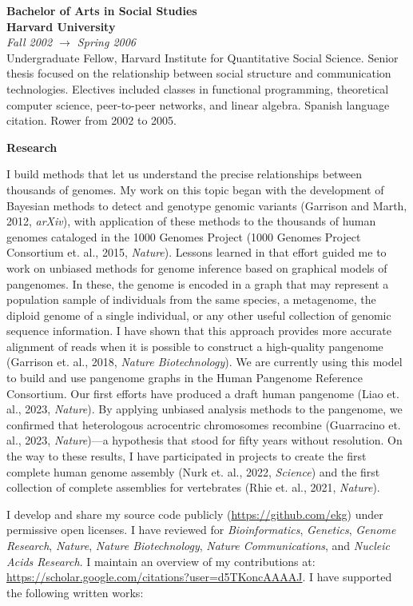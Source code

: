 \documentclass[11pt,hidelinks,letterpaper]{article}
\begin{document}
\hfill \break
\noindent
{\large \bf Bachelor of Arts in Social Studies \\ Harvard University} \\
\emph{Fall 2002 $\to$ Spring 2006} \\
\noindent
Undergraduate Fellow, Harvard Institute for Quantitative Social Science. Senior thesis focused on the relationship between social structure and communication technologies. Electives included classes in functional programming, theoretical computer science, peer-to-peer networks, and linear algebra. Spanish language citation. Rower from 2002 to 2005.

\hfill \break
\hfill \break
\noindent
{\LARGE \bf Research}

\hfill \break
\noindent
I build methods that let us understand the precise relationships between thousands of genomes.
My work on this topic began with the development of Bayesian methods to detect and genotype genomic variants (Garrison and Marth, 2012, \textit{arXiv}), with application of these methods to the thousands of human genomes cataloged in the 1000 Genomes Project (1000 Genomes Project Consortium et. al., 2015, \textit{Nature}).
Lessons learned in that effort guided me to work on unbiased methods for genome inference based on graphical models of pangenomes.
In these, the genome is encoded in a graph that may represent a population sample of individuals from the same species, a metagenome, the diploid genome of a single individual, or any other useful collection of genomic sequence information.
I have shown that this approach provides more accurate alignment of reads when it is possible to construct a high-quality pangenome (Garrison et. al., 2018, \textit{Nature Biotechnology}).
We are currently using this model to build and use pangenome graphs in the Human Pangenome Reference Consortium.
Our first efforts have produced a draft human pangenome (Liao et. al., 2023, \textit{Nature}).
By applying unbiased analysis methods to the pangenome, we confirmed that heterologous acrocentric chromosomes recombine (Guarracino et. al., 2023, \textit{Nature})---a hypothesis that stood for fifty years without resolution.
On the way to these results, I have participated in projects to create the first complete human genome assembly (Nurk et. al., 2022, \textit{Science}) and the first collection of complete assemblies for vertebrates (Rhie et. al., 2021, \textit{Nature}).

I develop and share my source code publicly (\url{https://github.com/ekg}) under permissive open licenses.
I have reviewed for \emph{Bioinformatics}, \emph{Genetics}, \emph{Genome Research}, \emph{Nature}, \emph{Nature Biotechnology}, \emph{Nature Communications}, and \emph{Nucleic Acids Research}.
I maintain an overview of my contributions at: \url{https://scholar.google.com/citations?user=d5TKoncAAAAJ}.
I have supported the following written works:
\end{document}
